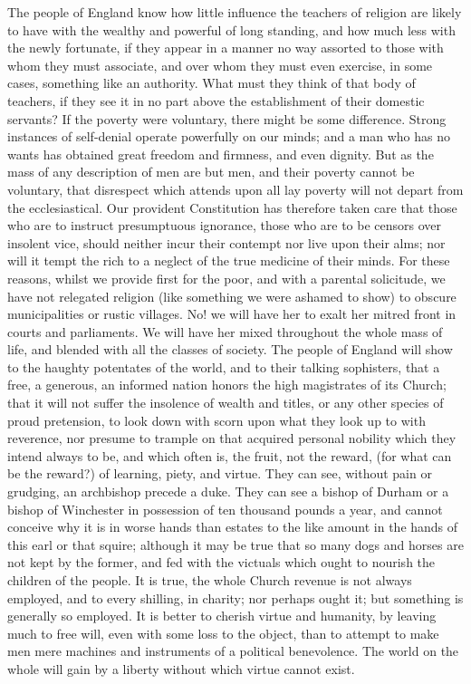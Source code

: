 The people of England know how little influence the teachers of religion are likely to have with the wealthy and powerful of long standing, and how much less with the newly fortunate, if they appear in a manner no way assorted to those with whom they must associate, and over whom they must even exercise, in some cases, something like an authority. What must they think of that body of teachers, if they see it in no part above the establishment of their domestic servants? If the poverty were voluntary, there might be some difference. Strong instances of self-denial operate powerfully on our minds; and a man who has no wants has obtained great freedom and firmness, and even dignity. But as the mass of any description of men are but men, and their poverty cannot be voluntary, that disrespect which attends upon all lay poverty will not depart from the ecclesiastical. Our provident Constitution has therefore taken care that those who are to instruct presumptuous ignorance, those who are to be censors over insolent vice, should neither incur their contempt nor live upon their alms; nor will it tempt the rich to a neglect of the true medicine of their minds. For these reasons, whilst we provide first for the poor, and with a parental solicitude, we have not relegated religion (like something we were ashamed to show) to obscure municipalities or rustic villages. No! we will have her to exalt her mitred front in courts and parliaments. We will have her mixed throughout the whole mass of life, and blended with all the classes of society. The people of England will show to the haughty potentates of the world, and to their talking sophisters, that a free, a generous, an informed nation honors the high magistrates of its Church; that it will not suffer the insolence of wealth and titles, or any other species of proud pretension, to look down with scorn upon what they look up to with reverence, nor presume to trample on that acquired personal nobility which they intend always to be, and which often is, the fruit, not the reward, (for what can be the reward?) of learning, piety, and virtue. They can see, without pain or grudging, an archbishop precede a duke. They can see a bishop of Durham or a bishop of Winchester in possession of ten thousand pounds a year, and cannot conceive why it is in worse hands than estates to the like amount in the hands of this earl or that squire; although it may be true that so many dogs and horses are not kept by the former, and fed with the victuals which ought to nourish the children of the people. It is true, the whole Church revenue is not always employed, and to every shilling, in charity; nor perhaps ought it; but something is generally so employed. It is better to cherish virtue and humanity, by leaving much to free will, even with some loss to the object, than to attempt to make men mere machines and instruments of a political benevolence. The world on the whole will gain by a liberty without which virtue cannot exist.

